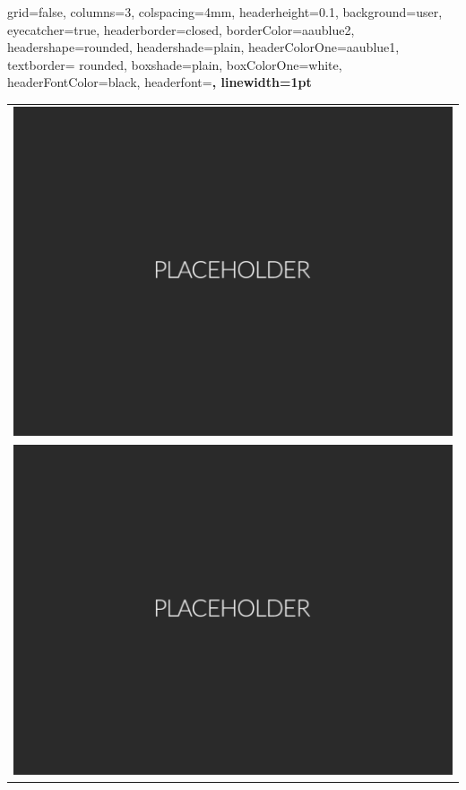 \documentclass[a0paper,portrait]{baposter}
\begin{document}


\begin{poster}{
  grid=false,
  columns=3,
  colspacing=4mm,
  headerheight=0.1\textheight,
  background=user,
  eyecatcher=true,
  headerborder=closed,
  borderColor=aaublue2,
  headershape=rounded,
  headershade=plain,
  headerColorOne=aaublue1,
  textborder= rounded,
  boxshade=plain,
  boxColorOne=white,
  headerFontColor=black,
  headerfont=\Large\sf\bf,
  linewidth=1pt
}
{
  \begin{tabular}{c}
  \includegraphics[height=0.4\headerheight]{Figures/Placeholder.png} \\
  \includegraphics[height=0.4\headerheight]{Figures/Placeholder.png}

\end{tabular}}
\end{poster}
\end{document}
